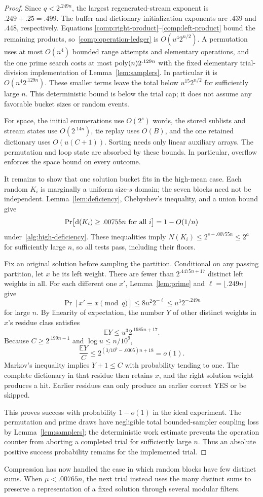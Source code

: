 \begin{proof}
Since $q<2^{.249n}$, the largest regenerated-stream exponent is
$.249+.25=.499$. The buffer and dictionary initialization exponents
are $.439$ and $.448$, respectively. Equations
\eqref{comp:right-product}--\eqref{comp:left-product} bound the
remaining products, so~\eqref{comp:operation-ledger} is
$O(u^4 2^{n/2})$. A permutation uses at most $O(n^4)$ bounded
range attempts and elementary operations, and the one prime search
costs at most $\operatorname{poly}(n)2^{.129n}$ with the fixed elementary
trial-division implementation of Lemma~\ref{lem:samplers}.
In particular it is $O(n^4 2^{.129n})$. These smaller terms leave
the total below $u^{15}2^{n/2}$ for sufficiently large $n$.
This deterministic bound is below the trial cap; it does not assume
any favorable bucket sizes or random events.

For space, the initial enumerations use $O(2^s)$ words, the stored
sublists and stream states use $O(2^{.14n})$, tie replay uses $O(B)$,
and the one retained dictionary uses $O(u(C+1))$. Sorting needs only
linear auxiliary arrays. The permutation and loop state are absorbed
by these bounds. In particular, overflow enforces the space bound on
every outcome.

It remains to show that one solution bucket fits in the high-mean
case. Each random $K_i$ is marginally a uniform size-$s$ domain;
the seven blocks need not be independent. Lemma~\ref{lem:deficiency},
Chebyshev's inequality, and a union bound give
\[
 \Pr\bigl[\mathrm{d}(K_i)\ge .00755n
             \text{ for all }i\bigr]=1-O(1/n)
\]
under~\eqref{alg:high-deficiency}. These inequalities imply
$N(K_i)\le2^{s-.00755n}\le2^a$ for sufficiently large $n$,
so all tests pass, including their floors.

Fix an original solution before sampling the partition. Conditional
on any passing partition, let $x$ be its left weight. There are fewer
than $2^{.4475n+17}$ distinct left weights in all. For each different
one $x'$, Lemma~\ref{lem:prime} and
$\ell=\lfloor .249n\rfloor$ give
\[
 \Pr[x'\equiv x\pmod q]
 \le 8u^2 2^{-\ell}\le u^3 2^{-.249n}
\]
for large $n$. By linearity of expectation, the number $Y$ of
other distinct weights in $x$'s residue class satisfies
\[
 \mathbb E Y\le u^3 2^{.1985n+17}.
\]
Because $C\ge2^{.199n-1}$ and $\log u\le n/10^9$,
\[
 \frac{\mathbb E Y}{C}
 \le 2^{(3/10^9-.0005)n+18}=o(1).
\]
Markov's inequality implies $Y+1\le C$ with probability tending
to one. The complete dictionary in that residue then retains $x$,
and the right solution weight produces a hit. Earlier residues can
only produce an earlier correct YES or be skipped.

This proves success with probability $1-o(1)$ in the ideal experiment.
The permutation and prime draws have negligible total bounded-sampler
coupling loss by Lemma~\ref{lem:samplers}; the deterministic work
estimate prevents the operation counter from aborting a completed
trial for sufficiently large $n$. Thus an absolute positive success
probability remains for the implemented trial.
\end{proof}

Compression has now handled the case in which random blocks have few
distinct sums. When $\mu<.00765n$, the next trial instead uses the
many distinct sums to preserve a representation of a fixed solution
through several modular filters.
